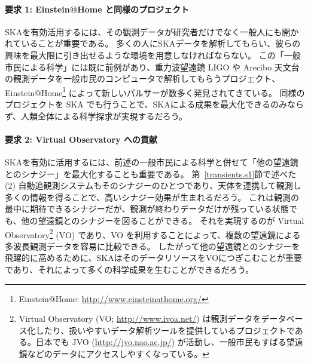 \paragraph{要求 1: Einstein@Home と同様のプロジェクト}
SKAを有効活用するには、その観測データが研究者だけでなく一般人にも開かれていることが重要である。
多くの人にSKAデータを解析してもらい、彼らの興味を最大限に引き出せるような環境を用意しなければならない。
この「一般市民による科学」には既に前例があり、重力波望遠鏡 LIGO や Arecibo 天文台の観測データを一般市民のコンピュータで解析してもらうプロジェクト、Einstein@Home\footnote{Einstein@Home: \url{http://www.einsteinathome.org/}} によって新しいパルサーが数多く発見されてきている。
同様のプロジェクトを SKA でも行うことで、SKAによる成果を最大化できるのみならず、人類全体による科学探求が実現するだろう。

\paragraph{要求 2: Virtual Observatory への貢献}
SKAを有効に活用するには、前述の一般市民による科学と併せて「他の望遠鏡とのシナジー」を最大化することも重要である。
第~\ref{transients.s1}節で述べた (2) 自動追観測システムもそのシナジーのひとつであり、天体を連携して観測し多くの情報を得ることで、高いシナジー効果が生まれるだろう。
これは観測の最中に期待できるシナジーだが、観測が終わりデータだけが残っている状態でも、他の望遠鏡とのシナジーを図ることができる。
それを実現するのが Virtual Observatory\footnote{Virtual Observatory (VO; \url{http://www.ivoa.net/}) は観測データをデータベース化したり、扱いやすいデータ解析ツールを提供しているプロジェクトである。日本でも JVO (\url{http://jvo.nao.ac.jp/}) が活動し、一般市民もすばる望遠鏡などのデータにアクセスしやすくなっている。} (VO) であり、VO を利用することによって、複数の望遠鏡による多波長観測データを容易に比較できる。
したがって他の望遠鏡とのシナジーを飛躍的に高めるために、SKAはそのデータリソースをVOにつぎこむことが重要であり、それによって多くの科学成果を生むことができるだろう。


